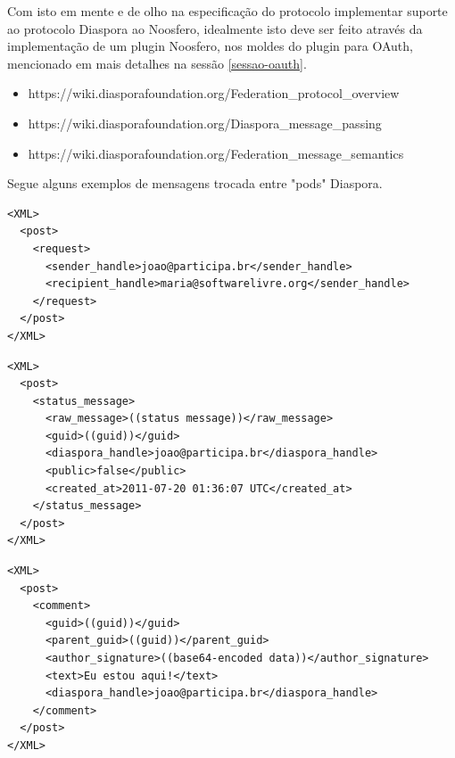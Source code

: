 \documentclass[12pt]{article}
\begin{document}
Com isto em mente e de olho na especificação do protocolo implementar suporte ao protocolo
Diaspora ao Noosfero, idealmente isto deve ser feito através da implementação
de um plugin Noosfero, nos moldes do plugin para OAuth, mencionado em mais
detalhes na sessão \ref{sessao-oauth}.

\begin{itemize}
  \item https://wiki.diasporafoundation.org/Federation\_protocol\_overview
  \item https://wiki.diasporafoundation.org/Diaspora\_message\_passing
  \item https://wiki.diasporafoundation.org/Federation\_message\_semantics
\end{itemize}

Segue alguns exemplos de mensagens trocada entre "pods" Diaspora.

\begin{framed}
\begin{lstlisting}[caption=Exemplo de notificação de compartilhamento]
<XML>
  <post>
    <request>
      <sender_handle>joao@participa.br</sender_handle>
      <recipient_handle>maria@softwarelivre.org</sender_handle>
    </request>
  </post>
</XML>
\end{lstlisting}
\end{framed}

\begin{framed}
\begin{lstlisting}[caption=Exemplo de atualização de status]
<XML>
  <post>
    <status_message>
      <raw_message>((status message))</raw_message>
      <guid>((guid))</guid>
      <diaspora_handle>joao@participa.br</diaspora_handle>
      <public>false</public>
      <created_at>2011-07-20 01:36:07 UTC</created_at>
    </status_message>
  </post>
</XML>
\end{lstlisting}
\end{framed}

\begin{framed}
\begin{lstlisting}[caption=Exemplo de comentário em uma atualização de status]
<XML>
  <post>
    <comment>
      <guid>((guid))</guid>
      <parent_guid>((guid))</parent_guid>
      <author_signature>((base64-encoded data))</author_signature>
      <text>Eu estou aqui!</text>
      <diaspora_handle>joao@participa.br</diaspora_handle>
    </comment>
  </post>
</XML>
\end{lstlisting}
\end{framed}
\end{document}
